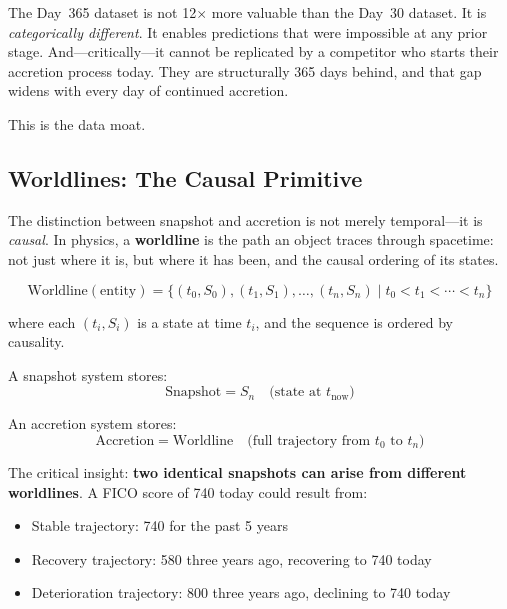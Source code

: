 \documentclass[11pt,twocolumn]{article}
\begin{document}
The Day~365 dataset is not 12$\times$ more valuable than the Day~30 dataset. It is \emph{categorically different}. It enables predictions that were impossible at any prior stage. And---critically---it cannot be replicated by a competitor who starts their accretion process today. They are structurally 365 days behind, and that gap widens with every day of continued accretion.

This is the data moat.

\subsection{Worldlines: The Causal Primitive}

The distinction between snapshot and accretion is not merely temporal---it is \emph{causal}. In physics, a \textbf{worldline} is the path an object traces through spacetime: not just where it is, but where it has been, and the causal ordering of its states.

\begin{equation}
\text{Worldline}(\text{entity}) = \{(t_0, S_0), (t_1, S_1), \ldots, (t_n, S_n) \mid t_0 < t_1 < \cdots < t_n\}
\end{equation}

where each $(t_i, S_i)$ is a state at time $t_i$, and the sequence is ordered by causality.

A snapshot system stores:
\begin{equation}
\text{Snapshot} = S_n \quad \text{(state at } t_{\text{now}}\text{)}
\end{equation}

An accretion system stores:
\begin{equation}
\text{Accretion} = \text{Worldline} \quad \text{(full trajectory from } t_0 \text{ to } t_n\text{)}
\end{equation}

The critical insight: \textbf{two identical snapshots can arise from different worldlines}. A FICO score of 740 today could result from:

\begin{itemize}[nosep,leftmargin=1.2em]
  \item Stable trajectory: 740 for the past 5 years
  \item Recovery trajectory: 580 three years ago, recovering to 740 today
  \item Deterioration trajectory: 800 three years ago, declining to 740 today
\end{itemize}
\end{document}
